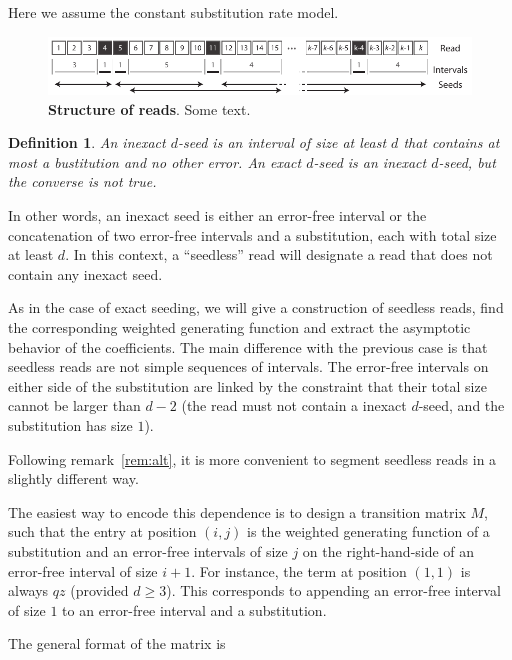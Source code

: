 \documentclass{article}
\newtheorem{definition}{Definition}
\begin{document}
Here we assume the constant substitution rate model.

\begin{figure}[h]
\centering
\includegraphics[scale=0.88]{sketch_inexact_seeding.pdf}
\caption{\textbf{Structure of reads}.
Some text.}
\label{fig:sketchinexact}

\end{figure}
\begin{definition}
\label{def:seed}
An inexact $d$-seed is an interval of size at least $d$ that contains at
most a bustitution and no other error. An exact $d$-seed is an inexact
$d$-seed, but the converse is not true.
\end{definition}

In other words, an inexact seed is either an error-free interval or the
concatenation of two error-free intervals and a substitution, each with
total size at least $d$. In this context, a ``seedless'' read will
designate a read that does not contain any inexact seed.

As in the case of exact seeding, we will give a construction of seedless
reads, find the corresponding weighted generating function and extract the
asymptotic behavior of the coefficients. The main difference with the
previous case is that seedless reads are not simple sequences of
intervals. The error-free intervals on either side of the substitution are
linked by the constraint that their total size cannot be larger than $d-2$
(the read must not contain a inexact $d$-seed, and the substitution has
size $1$).

Following remark~\ref{rem:alt}, it is more convenient to segment seedless
reads in a slightly different way.

The easiest way to encode this dependence is to design a transition matrix
$M$, such that the entry at position $(i,j)$ is the weighted generating
function of a substitution and an error-free intervals of size $j$ on the
right-hand-side of an error-free interval of size $i+1$. For instance, the
term at position $(1,1)$ is always $qz$ (provided $d \geq 3$). This
corresponds to appending an error-free interval of size $1$ to an
error-free interval and a substitution.

The general format of the matrix is
\end{document}
